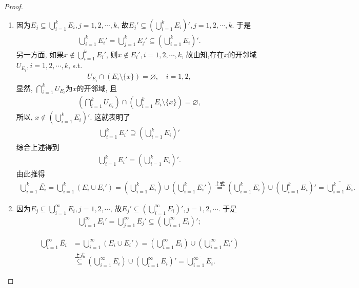 \documentclass[../../main.tex]{subfiles}%
\begin{document}
\begin{proof}
\begin{enumerate}[(1)]
\item 因为$E_j \subseteq \bigcup_{i=1}^k E_i, j=1,2,\cdots,k$, 故$E_j' \subseteq \left( \bigcup_{i=1}^k E_i \right)', j=1,2,\cdots,k$. 于是
\begin{align*}
\bigcup_{i=1}^k E_i' = \bigcup_{j=1}^k E_j' \subseteq \left( \bigcup_{i=1}^k E_i \right)'.
\end{align*}
另一方面, 如果$x \notin \bigcup_{i=1}^k E_i'$, 则$x \notin E_i', i=1,2,\cdots,k$, 故由知,存在$x$的开邻域$U_{E_i}, i=1,2,\cdots,k$, s.t.
\begin{align*}
U_{E_i} \cap (E_i \setminus \{x\}) = \varnothing, \quad i=1,2,
\end{align*}
显然, $\bigcap_{i=1}^k U_{E_i}$为$x$的开邻域, 且
\begin{align*}
\left( \bigcap_{i=1}^k U_{E_i} \right) \cap \left( \bigcup_{i=1}^k E_i \setminus \{x\} \right) = \varnothing,
\end{align*}
所以, $x \notin \left( \bigcup_{i=1}^k E_i \right)'.$ 这就表明了
\begin{align*}
\bigcup_{i=1}^k E_i' \supseteq \left( \bigcup_{i=1}^k E_i \right)'
\end{align*}
综合上述得到
\begin{align*}
\bigcup_{i=1}^k E_i' = \left( \bigcup_{i=1}^k E_i \right)'.
\end{align*}
由此推得
\begin{align*}
\bigcup_{i=1}^k \overline{E_i} = \bigcup_{i=1}^k (E_i \cup E_i') = \left( \bigcup_{i=1}^k E_i \right) \cup \left( \bigcup_{i=1}^k E_i' \right) \stackrel{上式}{=} \left( \bigcup_{i=1}^k E_i \right) \cup \left( \bigcup_{i=1}^k E_i \right)' = \overline{\bigcup_{i=1}^k E_i}.
\end{align*}

\item 因为$E_j \subseteq \bigcup_{i=1}^\infty E_i, j=1,2,\cdots$, 故$E_j' \subseteq \left( \bigcup_{i=1}^\infty E_i \right)', j=1,2,\cdots$. 于是
\begin{align*}
\bigcup_{i=1}^\infty E_i' = \bigcup_{j=1}^\infty E_j' \subseteq \left( \bigcup_{i=1}^\infty E_i \right)';
\end{align*}

\begin{align*}
\bigcup_{i=1}^\infty \overline{E_i} &= \bigcup_{i=1}^\infty (E_i \cup E_i') = \left( \bigcup_{i=1}^\infty E_i \right) \cup \left( \bigcup_{i=1}^\infty E_i' \right) \\
&\stackrel{上式}{\subseteq} \left( \bigcup_{i=1}^\infty E_i \right) \cup \left( \bigcup_{i=1}^\infty E_i \right)' = \overline{\bigcup_{i=1}^\infty E_i}.
\end{align*}


\end{enumerate}
\end{proof}
\end{document}
